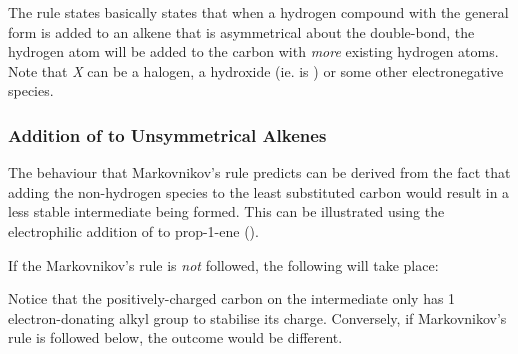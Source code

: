 		The rule states basically states that when a hydrogen compound with the general form  is added to an
		alkene that is asymmetrical about the double-bond, the hydrogen atom will be added to the carbon with \textit{more}
		existing hydrogen atoms. Note that \textit{X} can be a halogen, a hydroxide (ie.  is ) or some other
		electronegative species.



	\pagebreak


	\subsubsection{Addition of  to Unsymmetrical Alkenes}

		The behaviour that Markovnikov's rule predicts can be derived from the fact that adding the non-hydrogen species to the least substituted carbon would
		result in a less stable intermediate being formed. This can be illustrated using the electrophilic addition of
		 to prop-1-ene ().

		If the Markovnikov's rule is \textit{not} followed, the following will take place:



		Notice that the positively-charged carbon on the intermediate only has 1 electron-donating alkyl group to
		stabilise its charge. Conversely, if Markovnikov's rule is followed below, the outcome would be different.



